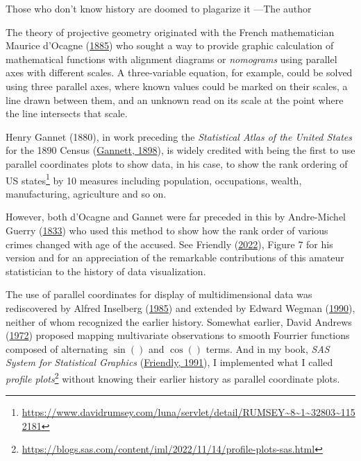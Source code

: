 \documentclass[
  letterpaper,
  10pt,
  krantz2]{krantz}
\renewenvironment{quote}{\begin{VF}}{\end{VF}}
\providecommand{\href}[2]{#2\footnote{\url{#1}}}
\begin{document}
\begin{tcolorbox}[enhanced jigsaw, arc=.35mm, opacitybacktitle=0.6, colback=white, bottomtitle=1mm, colbacktitle=quarto-callout-note-color!10!white, leftrule=.75mm, coltitle=black, titlerule=0mm, opacityback=0, toptitle=1mm, colframe=quarto-callout-note-color-frame, toprule=.15mm, left=2mm, breakable, rightrule=.15mm, title=\textcolor{quarto-callout-note-color}{\faInfo}\hspace{0.5em}{History Corner}, bottomrule=.15mm]

\begin{quote}
Those who don't know history are doomed to plagarize it ---The author
\end{quote}

The theory of projective geometry originated with the French
mathematician Maurice d'Ocagne
(\protect\hyperlink{ref-Ocagne:1885}{1885}) who sought a way to provide
graphic calculation of mathematical functions with alignment diagrams or
\emph{nomograms} using parallel axes with different scales. A
three-variable equation, for example, could be solved using three
parallel axes, where known values could be marked on their scales, a
line drawn between them, and an unknown read on its scale at the point
where the line intersects that scale.

Henry Gannet (1880), in work preceding the \emph{Statistical Atlas of
the United States} for the 1890 Census
(\protect\hyperlink{ref-Gannett:1898}{Gannett, 1898}), is widely
credited with being the first to use parallel coordinates plots to show
data, in his case, to show the
\href{https://www.davidrumsey.com/luna/servlet/detail/RUMSEY~8~1~32803~1152181}{rank
ordering of US states} by 10 measures including population, occupations,
wealth, manufacturing, agriculture and so on.

However, both d'Ocagne and Gannet were far preceded in this by
Andre-Michel Guerry (\protect\hyperlink{ref-Guerry:1833}{1833}) who used
this method to show how the rank order of various crimes changed with
age of the accused. See Friendly
(\protect\hyperlink{ref-Friendly2022}{2022}), Figure 7 for his version
and for an appreciation of the remarkable contributions of this amateur
statistician to the history of data visualization.

The use of parallel coordinates for display of multidimensional data was
rediscovered by Alfred Inselberg
(\protect\hyperlink{ref-Inselberg:1985}{1985}) and extended by Edward
Wegman (\protect\hyperlink{ref-Wegman:1990}{1990}), neither of whom
recognized the earlier history. Somewhat earlier, David Andrews
(\protect\hyperlink{ref-Andrews:72}{1972}) proposed mapping multivariate
observations to smooth Fourrier functions composed of alternating
\(\sin()\) and \(\cos()\) terms. And in my book, \emph{SAS System for
Statistical Graphics} (\protect\hyperlink{ref-Friendly:91}{Friendly,
1991}), I implemented what I called
\href{https://blogs.sas.com/content/iml/2022/11/14/profile-plots-sas.html}{\emph{profile
plots}} without knowing their earlier history as parallel coordinate
plots.

\end{tcolorbox}
\end{document}
